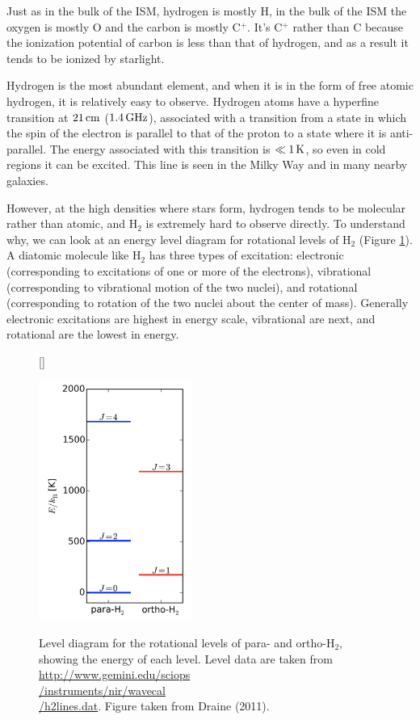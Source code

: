 \documentclass[a4paper,10pt]{article}
\begin{document}
{\noindent}Just as in the bulk of the ISM, hydrogen is mostly H, in the bulk of the ISM the oxygen is mostly O and the carbon is mostly C$^+$. It's C$^+$ rather than C because the ionization potential of carbon is less than that of hydrogen, and as a result it tends to be ionized by starlight.

{\noindent}Hydrogen is the most abundant element, and when it is in the form of free atomic hydrogen, it is relatively easy to observe. Hydrogen atoms have a hyperfine transition at $21\,{\rm cm}$ ($1.4\,{\rm GHz}$), associated with a transition from a state in which the spin of the electron is parallel to that of the proton to a state where it is anti-parallel. The energy associated with this transition is $\ll1\,{\rm K}$, so even in cold regions it can be excited. This line is seen in the Milky Way and in many nearby galaxies.

{\noindent}However, at the high densities where stars form, hydrogen tends to be molecular rather than atomic, and H$_2$ is extremely hard to observe directly. To understand why, we can look at an energy level diagram for rotational levels of H$_2$ (Figure \ref{fig:Henergies}). A diatomic molecule like H$_2$ has three types of excitation: electronic (corresponding to excitations of one or more of the electrons), vibrational (corresponding to vibrational motion of the two nuclei), and rotational (corresponding to rotation of the two nuclei about the center of mass). Generally electronic excitations are highest in energy scale, vibrational are next, and rotational are the lowest in energy.

\begin{figure}[t]
    [\FBwidth]
    {\caption{\footnotesize{Level diagram for the rotational levels of para- and ortho-H$_2$, showing the energy of each level. Level data are taken from \href{http://www.gemini.edu/sciops/instruments/nir/wavecal/h2lines.dat}{http://www.gemini.edu/sciops\\/instruments/nir/wavecal\\/h2lines.dat}. Figure taken from Draine (2011).}}
    \label{fig:Henergies}}
    {\includegraphics[width=5cm]{figures/Henergies.png}}
\end{figure}
\end{document}
